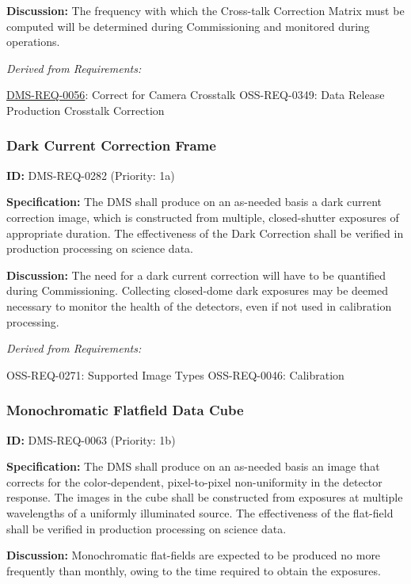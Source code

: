 \documentclass[SE,toc,lsstdraft]{lsstdoc}
\begin{document}
\textbf{Discussion: }The frequency with which the Cross-talk Correction Matrix must be computed will be determined during Commissioning and monitored during operations.

\emph{Derived from Requirements:}

\hyperref[DMS-REQ-0056]{DMS-REQ-0056}:
Correct for Camera Crosstalk \newline
OSS-REQ-0349:
Data Release Production Crosstalk Correction \newline

\subsubsection{Dark Current Correction Frame}

\label{DMS-REQ-0282}
\textbf{ID:} DMS-REQ-0282 (Priority: 1a)

\textbf{Specification:} The DMS shall produce on an as-needed basis a dark current correction image, which is constructed from multiple, closed-shutter exposures of appropriate duration. The effectiveness of the Dark Correction shall be verified in production processing on science data.

\textbf{Discussion: }The need for a dark current correction will have to be quantified during Commissioning. Collecting closed-dome dark exposures may be deemed necessary to monitor the health of the detectors, even if not used in calibration processing.

\emph{Derived from Requirements:}

OSS-REQ-0271:
Supported Image Types \newline
OSS-REQ-0046:
Calibration \newline

\subsubsection{Monochromatic Flatfield Data Cube}

\label{DMS-REQ-0063}
\textbf{ID:} DMS-REQ-0063 (Priority: 1b)

\textbf{Specification:} The DMS shall produce on an as-needed basis an image that corrects for the color-dependent, pixel-to-pixel non-uniformity in the detector response. The images in the cube shall be constructed from exposures at multiple wavelengths of a uniformly illuminated source. The effectiveness of the flat-field shall be verified in production processing on science data.

\textbf{Discussion:} Monochromatic flat-fields are expected to be produced no more frequently than monthly, owing to the time required to obtain the exposures.
\end{document}
